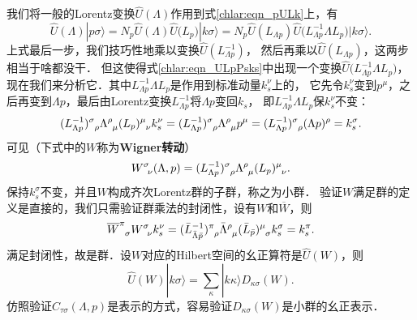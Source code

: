 我们将一般的Lorentz变换$\hat{U}(\Lambda)$作用到式\eqref{chlar:eqn_pULk}上，有
\begin{equation}\label{chlar:eqn_ULpPsks}
	\hat{U}(\Lambda) |p\sigma\rangle = N_p \hat{U}(\Lambda) \hat{U}\bigl(L_p\bigr) |k\sigma\rangle
	= N_p \hat{U}(L_{\Lambda p}) \hat{U}\bigl(L^{-1}_{\Lambda p}\Lambda L_p\bigr) |k\sigma\rangle .
\end{equation}
上式最后一步，我们技巧性地乘以变换$\hat{U}(L^{-1}_{\Lambda p})$，
然后再乘以$\hat{U}(L_{\Lambda p})$，这两步相当于啥都没干．
但这使得式\eqref{chlar:eqn_ULpPsks}中出现一个变换$\hat{U}\bigl(L^{-1}_{\Lambda p}\Lambda L_p\bigr)$，
现在我们来分析它．其中$L^{-1}_{\Lambda p}\Lambda L_p$是作用到标准动量$k^\nu_s$上的，
它先令$k^\nu_s$变到$p^\mu$，之后再变到$\Lambda p$，最后由Lorentz变换$L^{-1}_{\Lambda p}$将$\Lambda p$变回$k_s$，
即$L^{-1}_{\Lambda p}\Lambda L_p$保$k^\nu_s$不变：
\begin{equation}
	(L^{-1}_{\Lambda p})^\sigma_{\hphantom{\sigma}\rho} \Lambda^\rho_{\hphantom{\rho}\mu}
	(L_p)^\mu_{\hphantom{\mu}\nu} k^\nu_s 
	= (L^{-1}_{\Lambda p})^\sigma_{\hphantom{\sigma}\rho} \Lambda^\rho_{\hphantom{\rho}\mu} p^\mu
	= (L^{-1}_{\Lambda p})^\sigma_{\hphantom{\sigma}\rho} (\Lambda p)^\rho	= k^\sigma_s .
\end{equation}
可见（下式中的$W$称为{\heiti \bfseries Wigner转动}）
\begin{equation}\label{chlar:eqn_Wigner-rotation}
	W^\sigma_{\hphantom{\sigma}\nu}(\Lambda,p) = (L^{-1}_{\Lambda p})^\sigma_{\hphantom{\sigma}\rho} 
	\Lambda^\rho_{\hphantom{\rho}\mu}(L_p)^\mu_{\hphantom{\mu}\nu} .
\end{equation}
保持$k^\sigma_s$不变，并且$W$构成齐次Lorentz群的子群，称之为{\heiti 小群}．
验证$W$满足群的定义是直接的，我们只需验证群乘法的封闭性，设有$W$和$\overline{W}$，则
\begin{align*}
	\overline{W}^\pi_{\hphantom{\pi}\sigma} W^\sigma_{\hphantom{\sigma}\nu} k^\nu_s
	=(\bar{L}^{-1}_{\bar{\Lambda} \bar{p}})^\pi_{\hphantom{\sigma}\rho} \bar{\Lambda}^\rho_{\hphantom{\rho}\mu}
	(\bar{L}_{\bar{p}})^\mu_{\hphantom{\mu}\sigma} k^\sigma_s = k^\pi_s .
\end{align*}
满足封闭性，故是群．设$W$对应的Hilbert空间的幺正算符是$\hat{U}(W)$，则
\begin{equation}\label{chlar:eqn_UWk}
	\hat{U}(W) |k\sigma\rangle = \sum_{\kappa} |k\kappa\rangle D_{\kappa \sigma}(W) .
\end{equation}
仿照验证$C_{\tau \sigma}(\Lambda,p)$是表示的方式，容易验证$D_{\kappa \sigma}(W)$是小群的幺正表示．

